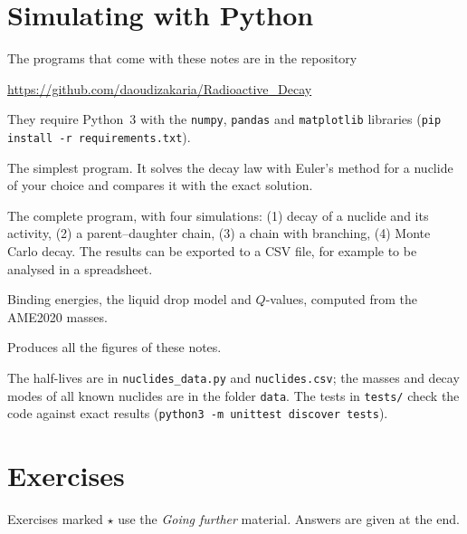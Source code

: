 \documentclass[11pt,a4paper]{article}
\begin{document}
\section{Simulating with Python}

The programs that come with these notes are in the repository
\begin{center}\url{https://github.com/daoudizakaria/Radioactive_Decay}\end{center}
They require Python~3 with the \texttt{numpy}, \texttt{pandas} and \texttt{matplotlib} libraries (\texttt{pip install -r requirements.txt}).

\begin{description}[leftmargin=1em]
  \item[\texttt{radioactivity.py}] The simplest program. It solves the decay law with Euler's method for a nuclide of your choice and compares it with the exact solution.
  \item[\texttt{nuclear.py}] The complete program, with four simulations: (1) decay of a nuclide and its activity, (2) a parent--daughter chain, (3) a chain with branching, (4) Monte Carlo decay. The results can be exported to a CSV file, for example to be analysed in a spreadsheet.
  \item[\texttt{nuclear\_energy.py}] Binding energies, the liquid drop model and $Q$-values, computed from the AME2020 masses.
  \item[\texttt{make\_figures.py}] Produces all the figures of these notes.
\end{description}

\noindent The half-lives are in \texttt{nuclides\_data.py} and \texttt{nuclides.csv}; the masses and decay modes of all known nuclides are in the folder \texttt{data}. The tests in \texttt{tests/} check the code against exact results (\texttt{python3 -m unittest discover tests}).

\section{Exercises}

Exercises marked $\star$ use the \emph{Going further} material. Answers are given at the end.
\end{document}
